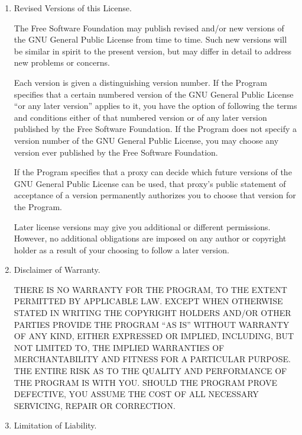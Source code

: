 \begin{enumerate}
  \item Revised Versions of this License.

        The Free Software Foundation may publish revised and/or new versions of
        the GNU General Public License from time to time.  Such new versions will
        be similar in spirit to the present version, but may differ in detail to
        address new problems or concerns.

        Each version is given a distinguishing version number.  If the
        Program specifies that a certain numbered version of the GNU General
        Public License ``or any later version'' applies to it, you have the
        option of following the terms and conditions either of that numbered
        version or of any later version published by the Free Software
        Foundation.  If the Program does not specify a version number of the
        GNU General Public License, you may choose any version ever published
        by the Free Software Foundation.

        If the Program specifies that a proxy can decide which future
        versions of the GNU General Public License can be used, that proxy's
        public statement of acceptance of a version permanently authorizes you
        to choose that version for the Program.

        Later license versions may give you additional or different
        permissions.  However, no additional obligations are imposed on any
        author or copyright holder as a result of your choosing to follow a
        later version.

  \item Disclaimer of Warranty.

        \begin{sloppypar}
          THERE IS NO WARRANTY FOR THE PROGRAM, TO THE EXTENT PERMITTED BY
          APPLICABLE LAW.  EXCEPT WHEN OTHERWISE STATED IN WRITING THE
          COPYRIGHT HOLDERS AND/OR OTHER PARTIES PROVIDE THE PROGRAM ``AS IS''
          WITHOUT WARRANTY OF ANY KIND, EITHER EXPRESSED OR IMPLIED,
          INCLUDING, BUT NOT LIMITED TO, THE IMPLIED WARRANTIES OF
          MERCHANTABILITY AND FITNESS FOR A PARTICULAR PURPOSE.  THE ENTIRE
          RISK AS TO THE QUALITY AND PERFORMANCE OF THE PROGRAM IS WITH YOU.
          SHOULD THE PROGRAM PROVE DEFECTIVE, YOU ASSUME THE COST OF ALL
          NECESSARY SERVICING, REPAIR OR CORRECTION.
        \end{sloppypar}

  \item Limitation of Liability.


\end{enumerate}
